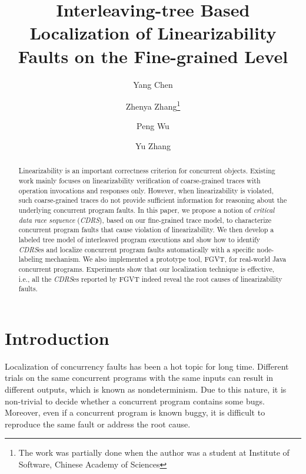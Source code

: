 \documentclass[runningheads]{llncs}
\begin{document}
%
\title{Interleaving-tree Based Localization of Linearizability Faults on the Fine-grained Level}
%
%
\author{Yang Chen \and
Zhenya Zhang\thanks{The work was partially done when the author was a student at Institute of Software, Chinese Academy of Sciences} \and
Peng Wu\and
Yu Zhang}
%
%
%
\maketitle              %
%
\begin{abstract}
Linearizability is an important correctness criterion for concurrent objects. Existing work mainly focuses on linearizability verification of coarse-grained traces with operation invocations and responses only. However, when linearizability is violated, such coarse-grained traces do not provide sufficient information for reasoning about the underlying concurrent program faults. In this paper, we propose a notion of \textit{critical data race sequence} (\textit{CDRS}), based on our fine-grained trace model, to characterize concurrent program faults that cause violation of linearizability. We then develop a labeled tree model of interleaved program executions and show how to identify \textit{CDRS}es and localize concurrent program faults automatically with a specific node-labeling mechanism. We also implemented a prototype tool, FGVT, for real-world Java concurrent programs. Experiments show that our localization technique is effective, i.e., all the \textit{CDRS}es reported by FGVT indeed reveal the root causes of linearizability faults.

\end{abstract}
%
%
%
%
%
\section{Introduction}\label{sec:introduction}
Localization of concurrency faults has been a hot topic for long time.
Different trials on the same concurrent programs with the same inputs can result in different outputs,
which is known as nondeterminism. Due to this nature, 
it is non-trivial to decide whether a concurrent program contains some bugs.
Moreover, even if a concurrent program is known buggy, 
it is difficult to reproduce the same fault or address the root cause.
\end{document}

